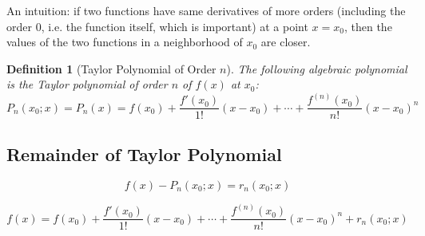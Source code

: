 \documentclass[onecolumn]{ctexart}
\newtheorem{definition}{Definition}
\begin{document}
An intuition: if two functions have same derivatives of more orders (including 
the order $0$, i.e. the function itself, which is important) at a point $x = x_0$, 
then the values of the two functions in a neighborhood of $x_0$ are closer.

\begin{definition}[Taylor Polynomial of Order $n$]
  The following algebraic polynomial is the Taylor polynomial of order $n$ of 
  $f(x)$ at $x_0$:
  \begin{equation}
    P_n(x_0; x) = P_n(x) = f(x_0) + \frac{f'(x_0)}{1!}(x - x_0) + \cdots + \frac{f^{(n)}(x_0)}{n!}(x - x_0)^n
  \end{equation}
\end{definition}

\subsection{Remainder of Taylor Polynomial}

\begin{equation}
  f(x) - P_n(x_0; x) = r_n(x_0; x)
\end{equation}

\begin{equation}
  f(x) = f(x_0) + \frac{f'(x_0)}{1!}(x - x_0) + \cdots + \frac{f^{(n)}(x_0)}{n!}(x - x_0)^n + r_n(x_0; x)
\end{equation}
\end{document}

